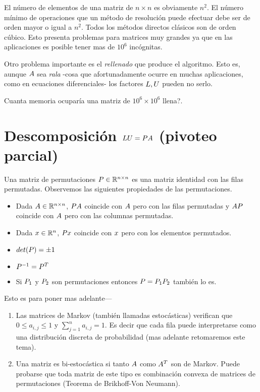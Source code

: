 \begin{tcolorbox}
El número de elementos de una matriz de $n\times n$ es obviamente $n^2$. El número mínimo de operaciones que un método de resolución puede efectuar debe ser de orden mayor o igual a $n^2$. Todos los métodos directos clásicos son de orden cúbico. Esto presenta problemas para matrices muy grandes ya que en las aplicaciones es posible tener mas de $10^6$ incógnitas.

Otro problema importante es el \emph{rellenado} que produce el algoritmo. Esto es, aunque $\Ab$ sea \emph{rala} -cosa que afortunadamente ocurre en muchas aplicaciones, como en ecuaciones diferenciales- los factores $\Lb,\Ub$ pueden no serlo.

\begin{ej}
 Cuanta memoria ocuparía una matriz
 de $10^6\times 10^6$ llena?.
\end{ej}



\section{Descomposición $\Lb\Ub=\Pb\Ab$ (pivoteo parcial)}
Una matriz de permutaciones $\Pb\in \Rnn$
es una matriz identidad con las filas permutadas. Observemos las siguientes propiedades de las permutaciones.
\begin{itemize}
 \item Dada $\Ab\in \Rnn$, $\Pb\Ab$ coincide con $\Ab$ pero con las filas permutadas y $\Ab\Pb$ coincide con $\Ab$ pero con las columnas permutadas.
 \item Dada $\xb\in \Rn$, $\Pb\xb$ coincide con $\xb$ pero con los elementos permutados.
 \item $det(\Pb)=\pm 1$
 \item $\Pb^{-1}=\Pb^T$
 \item Si $\Pb_1$ y $\Pb_2$ son permutaciones entonces $\Pb=\Pb_1\Pb_2$ también lo es.
\end{itemize}
\begin{tcolorbox}
Esto es para poner mas adelante---
 \begin{rem}
 \begin{enumerate}
  \item Las matrices de Markov (también llamadas estocásticas) verifican que $0\le a_{i,j}\le 1$
  y $\sum_{j=1}^na_{i,j}=1$. Es decir que cada fila puede interpretarse como una distribución discreta de probabilidad (mas adelante retomaremos este tema).
  \item Una matriz es bi-estocástica si tanto $\Ab$ como $\Ab^T$ son de Markov. Puede probarse que toda matriz de este tipo es combinación convexa de matrices de permutaciones
  (Teorema de Brikhoff-Von Neumann).
 \end{enumerate}
 \end{rem}
\end{tcolorbox}



\end{tcolorbox}
